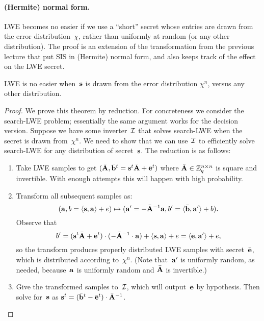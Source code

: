 \documentclass[11pt]{article}
\begin{document}
\paragraph{(Hermite) normal form.}

LWE becomes no easier if we use a ``short'' secret whose entries are
drawn from the error distribution~$\chi$, rather than uniformly at
random (or any other distribution). The proof is an extension of the
transformation from the previous lecture that put SIS in (Hermite)
normal form, and also keeps track of the effect on the LWE secret.

\begin{theorem}
  LWE is no easier when~$\mathbf{s}$ is drawn from the error distribution
  $\chi^n$, versus any other distribution.
\end{theorem}

\begin{proof}
  We prove this theorem by reduction. For concreteness we consider the
  search-LWE problem; essentially the same argument works for the
  decision version. Suppose we have some inverter~$\mathcal{I}$ that solves
  search-LWE when the secret is drawn from~$\chi^n$. We need to show
  that we can use~$\mathcal{I}$ to efficiently solve search-LWE for any
  distribution of secret~$\mathbf{s}$. The reduction is as follows:
  \begin{enumerate}
  \item Take LWE samples to get
    $(\bar{\mathbf{A}}, \bar{\mathbf{b}}^t = \mathbf{s}^t\bar{\mathbf{A}} +
    \bar{\mathbf{e}}^t)$ where $\bar{\mathbf{A}} \in \mathbb{Z}_q^{n\times n}$ is square
    and invertible. With enough attempts this will happen with high
    probability.

  \item Transform all subsequent samples as:
    \[ (\mathbf{a}, b = \langle\mathbf{s},\mathbf{a}\rangle+e) \mapsto (\mathbf{a}' =
      -\bar{\mathbf{A}}^{-1} \mathbf{a}, b' = \langle\bar{\mathbf{b}},\mathbf{a}'\rangle + b) . \]
    Observe that
    \[ 
      b' = (\mathbf{s}^t \bar{\mathbf{A}} + \bar{\mathbf{e}}^{t}) \cdot
      (-\bar{\mathbf{A}}^{-1} \cdot \mathbf{a}) + \langle\mathbf{s},\mathbf{a}\rangle + e =
      \langle\bar{\mathbf{e}},\mathbf{a}'\rangle + e ,
    \]
    so the transform produces properly distributed LWE samples with
    secret~$\bar{\mathbf{e}}$, which is distributed according
    to~$\chi^{n}$. (Note that~$\mathbf{a}'$ is uniformly random, as needed,
    because~$\mathbf{a}$ is uniformly random and $\bar{\mathbf{A}}$ is
    invertible.)

  \item Give the transformed samples to~$\mathcal{I}$, which will
    output~$\bar{\mathbf{e}}$ by hypothesis. Then solve for~$\mathbf{s}$ as
    $\mathbf{s}^{t} = (\bar{\mathbf{b}}^{t} - \bar{\mathbf{e}}^{t}) \cdot
    \bar{\mathbf{A}}^{-1}$.
  \end{enumerate}
\end{proof}
 
\end{document}
